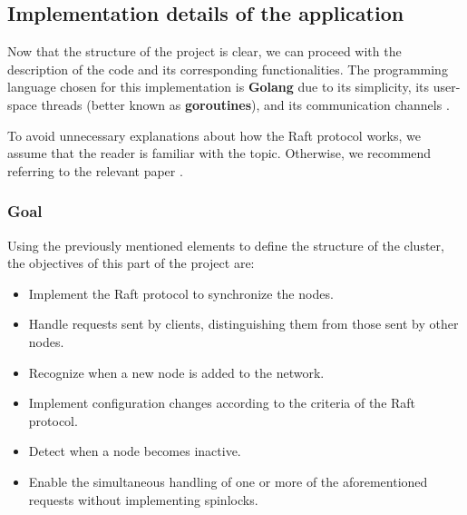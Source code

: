 \subsection{Implementation details of the application}
Now that the structure of the project is clear, we can proceed with the description 
of the code and its corresponding functionalities. The programming language chosen 
for this implementation is \textbf{Golang} due to its simplicity, its user-space threads 
(better known as \textbf{goroutines}), and its communication channels \cite{2}.

To avoid unnecessary explanations about how the Raft protocol works, we assume 
that the reader is familiar with the topic. Otherwise, we recommend referring to 
the relevant paper \cite{1}.

\subsubsection{Goal}
Using the previously mentioned elements to define the structure of the cluster, 
the objectives of this part of the project are:
\begin{itemize}
  \item Implement the Raft protocol to synchronize the nodes.
  \item Handle requests sent by clients, distinguishing them from those sent by other nodes.
  \item Recognize when a new node is added to the network.
  \item Implement configuration changes according to the criteria of the Raft protocol.
  \item Detect when a node becomes inactive.
  \item Enable the simultaneous handling of one or more of the aforementioned requests without implementing spinlocks.
\end{itemize}

